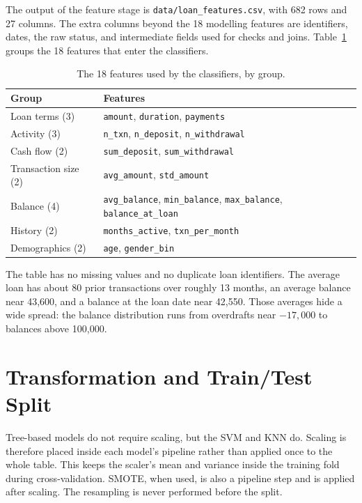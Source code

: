The output of the feature stage is \texttt{data/loan\_features.csv}, with 682 rows and 27 columns. The extra columns beyond the 18 modelling features are identifiers, dates, the raw status, and intermediate fields used for checks and joins. Table~\ref{tab:model-features} groups the 18 features that enter the classifiers.

\begin{table}[H]
    \centering
    \caption{The 18 features used by the classifiers, by group.}
    \label{tab:model-features}
    \begin{tabularx}{\textwidth}{@{}lX@{}}
        \toprule
        \textbf{Group} & \textbf{Features} \\
        \midrule
        Loan terms (3) & \texttt{amount}, \texttt{duration}, \texttt{payments} \\
        Activity (3) & \texttt{n\_txn}, \texttt{n\_deposit}, \texttt{n\_withdrawal} \\
        Cash flow (2) & \texttt{sum\_deposit}, \texttt{sum\_withdrawal} \\
        Transaction size (2) & \texttt{avg\_amount}, \texttt{std\_amount} \\
        Balance (4) & \texttt{avg\_balance}, \texttt{min\_balance}, \texttt{max\_balance}, \texttt{balance\_at\_loan} \\
        History (2) & \texttt{months\_active}, \texttt{txn\_per\_month} \\
        Demographics (2) & \texttt{age}, \texttt{gender\_bin} \\
        \bottomrule
    \end{tabularx}
\end{table}

The table has no missing values and no duplicate loan identifiers. The average loan has about 80 prior transactions over roughly 13 months, an average balance near 43,600, and a balance at the loan date near 42,550. Those averages hide a wide spread: the balance distribution runs from overdrafts near $-17{,}000$ to balances above 100{,}000.

\section{Transformation and Train/Test Split}
\label{sec:split}

Tree-based models do not require scaling, but the SVM and KNN do. Scaling is therefore placed inside each model's pipeline rather than applied once to the whole table. This keeps the scaler's mean and variance inside the training fold during cross-validation. SMOTE, when used, is also a pipeline step and is applied after scaling. The resampling is never performed before the split.

